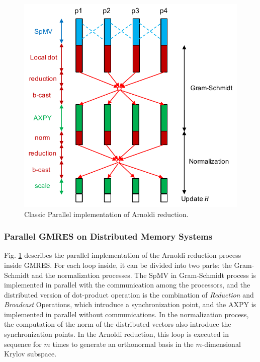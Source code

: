 \begin{figure}[h]
	\centering
	\includegraphics[width=5.4in]{fig/parallel_gmres.pdf}
	\caption{Classic Parallel implementation of Arnoldi reduction.}
	\label{parallel_gmres}
\end{figure}

\subsubsection{Parallel GMRES on Distributed Memory Systems}

Fig. \ref{parallel_gmres} describes the parallel implementation of the Arnoldi reduction process inside GMRES.  For each loop inside, it can be divided into two parts: the Gram-Schmidt and the normalization processes. The SpMV in Gram-Schmidt process is implemented in parallel with the communication among the processors, and the distributed version of dot-product operation is the combination of \textit{Reduction} and \textit{Broadcast} Operations, which introduce a synchronization point, and the AXPY is implemented in parallel without communications. In the normalization process, the computation of the norm of the distributed vectors also introduce the synchronization points. In the Arnoldi reduction, this loop is executed in sequence for $m$ times to generate an orthonormal basis in the $m$-dimensional Krylov subspace.

